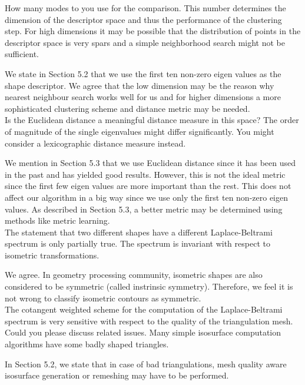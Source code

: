 \documentclass[10pt]{article}
\begin{document}
   How many modes to you use for the comparison. This number determines
   the dimension of the descriptor space and thus the performance of the
   clustering step. For high dimensions it may be possible that the
   distribution of points in the descriptor space is very spars and a simple
   neighborhood search might not be sufficient. 

   {\color{blue}We state in Section 5.2 that we use the first ten non-zero eigen
	   values as the shape descriptor. We agree that the low dimension
	   may be the reason why
	   nearest neighbour search works well for us 
	   and for higher dimensions a more sophisticated clustering
   scheme and distance metric may be needed.}\\

   Is the Euclidean distance a meaningful distance measure in this space?
   The order of magnitude of the single eigenvalues might differ
   significantly. You might consider a lexicographic distance measure
   instead.

   {\color{blue}We mention in Section 5.3 that we use Euclidean distance
	   since it has been used in the past and has yielded good results.
	   However, this is not the ideal metric since the first few eigen
	   values are more important than the rest. This does not affect our
	   algorithm in a big way since we use only the first ten non-zero
	   eigen values. As described in Section 5.3, a better metric may
   be determined using methods like metric learning.}\\

   The statement that two different shapes have a different
   Laplace-Beltrami spectrum is only partially true. The spectrum is
   invariant with respect to isometric transformations.  

   {\color{blue} We agree. In geometry processing community,
	   isometric shapes are also considered to be symmetric (called instrinsic symmetry).
   Therefore, we feel it is not wrong to classify isometric contours as symmetric.}\\

   The cotangent weighted scheme for the computation of the
   Laplace-Beltrami spectrum is very sensitive with respect to the quality
   of the triangulation mesh. Could you please discuss related issues. Many
   simple isosurface computation algorithms have some badly shaped
   triangles.

   {\color{blue}In Section 5.2, we state that in case of bad triangulations,
	   mesh quality aware isosurface generation or remeshing may have to
   be performed.}\\
\end{document}
